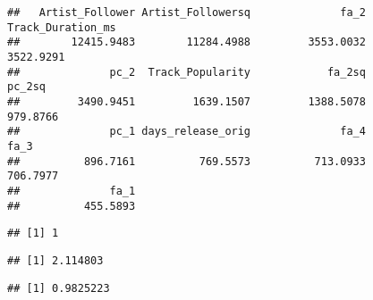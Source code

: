 \documentclass[
]{article}
\newenvironment{Shaded}{\begin{snugshade}}{\end{snugshade}}
\newcommand{\DataTypeTok}[1]{\textcolor[rgb]{0.13,0.29,0.53}{#1}}
\newcommand{\DecValTok}[1]{\textcolor[rgb]{0.00,0.00,0.81}{#1}}
\newcommand{\KeywordTok}[1]{\textcolor[rgb]{0.13,0.29,0.53}{\textbf{#1}}}
\newcommand{\NormalTok}[1]{#1}
\newcommand{\OperatorTok}[1]{\textcolor[rgb]{0.81,0.36,0.00}{\textbf{#1}}}
\newcommand{\StringTok}[1]{\textcolor[rgb]{0.31,0.60,0.02}{#1}}
\begin{document}
\begin{verbatim}
##   Artist_Follower Artist_Followersq              fa_2 Track_Duration_ms 
##        12415.9483        11284.4988         3553.0032         3522.9291 
##              pc_2  Track_Popularity            fa_2sq            pc_2sq 
##         3490.9451         1639.1507         1388.5078          979.8766 
##              pc_1 days_release_orig              fa_4              fa_3 
##          896.7161          769.5573          713.0933          706.7977 
##              fa_1 
##          455.5893
\end{verbatim}

\begin{Shaded}
\end{Shaded}

\begin{verbatim}
## [1] 1
\end{verbatim}

\begin{Shaded}
\end{Shaded}

\begin{verbatim}
## [1] 2.114803
\end{verbatim}

\begin{Shaded}
\end{Shaded}

\begin{verbatim}
## [1] 0.9825223
\end{verbatim}
\end{document}
